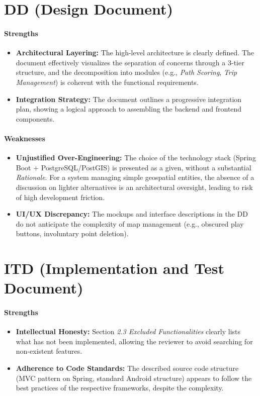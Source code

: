 \section{DD (Design Document)}
\paragraph{Strengths}
\begin{itemize}
    \item \textbf{Architectural Layering:} The high-level architecture is clearly defined. The document effectively visualizes the separation of concerns through a 3-tier structure, and the decomposition into modules (e.g., \textit{Path Scoring}, \textit{Trip Management}) is coherent with the functional requirements.
    \item \textbf{Integration Strategy:} The document outlines a progressive integration plan, showing a logical approach to assembling the backend and frontend components.
\end{itemize}

\paragraph{Weaknesses }
\begin{itemize}
    \item \textbf{Unjustified Over-Engineering:} The choice of the technology stack (Spring Boot + PostgreSQL/PostGIS) is presented as a given, without a substantial \textit{Rationale}. For a system managing simple geospatial entities, the absence of a discussion on lighter alternatives is an architectural oversight, leading to risk of high development friction.
    \item \textbf{UI/UX Discrepancy:} The mockups and interface descriptions in the DD do not anticipate the complexity of map management (e.g., obscured play buttons, involuntary point deletion).
\end{itemize}

\section{ITD (Implementation and Test Document)}
\paragraph{Strengths}
\begin{itemize}
    \item \textbf{Intellectual Honesty:} Section \textit{2.3 Excluded Functionalities} clearly lists what has not been implemented, allowing the reviewer to avoid searching for non-existent features.
    \item \textbf{Adherence to Code Standards:} The described source code structure (MVC pattern on Spring, standard Android structure) appears to follow the best practices of the respective frameworks, despite the complexity.
\end{itemize}

